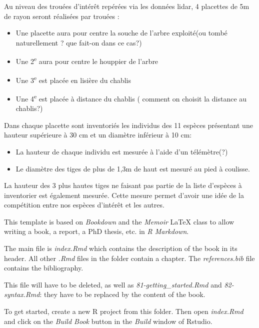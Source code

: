 \documentclass[
  12pt,
  american,
  a4paper,
  extrafontsizes,onecolumn,openright
  ]{memoir}
\begin{document}
Au niveau des trouées d'intérêt repérées via les données lidar, 4 placettes de 5m de rayon seront réalisées par trouées :

\begin{itemize}
\item
  Une placette aura pour centre la souche de l'arbre exploité(ou tombé naturellement ? que fait-on dans ce cas?)
\item
  Une 2\textsuperscript{e} aura pour centre le houppier de l'arbre
\item
  Une 3\textsuperscript{e} est placée en lisière du chablis
\item
  Une 4\textsuperscript{e} est placée à distance du chablis ( comment on choisit la distance au chablis?)
\end{itemize}

Dans chaque placette sont inventoriés les individus des 11 espèces présentant une hauteur supérieure à 30 cm et un diamètre inférieur à 10 cm:

\begin{itemize}
\item
  La hauteur de chaque individu est mesurée à l'aide d'un télémètre(?)
\item
  Le diamètre des tiges de plus de 1,3m de haut est mesuré au pied à coulisse.
\end{itemize}

La hauteur des 3 plus hautes tiges ne faisant pas partie de la liste d'espèces à inventorier est également mesurée. Cette mesure permet d'avoir une idée de la compétition entre nos espèces d'intérêt et les autres.

This template is based on \emph{Bookdown} and the \emph{Memoir} LaTeX class to allow writing a book, a report, a PhD thesis, etc. in \emph{R Markdown}.

The main file is \emph{index.Rmd} which contains the description of the book in its header. All other \emph{.Rmd} files in the folder contain a chapter.
The \emph{references.bib} file contains the bibliography.

This file will have to be deleted, as well as \emph{81-getting\_started.Rmd} and \emph{82-syntax.Rmd}: they have to be replaced by the content of the book.

To get started, create a new R project from this folder.
Then open \emph{index.Rmd} and click on the \emph{Build Book} button in the \emph{Build} window of Rstudio.


\end{document}
